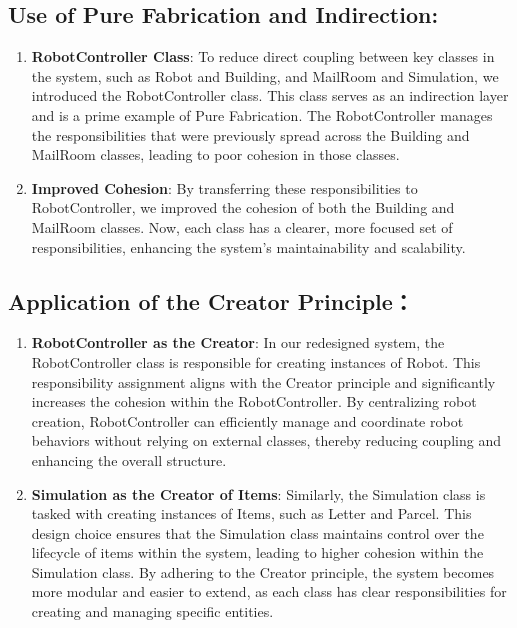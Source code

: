 \documentclass[12pt]{article}
\begin{document}
\subsection{Use of Pure Fabrication and Indirection:}
\begin{enumerate}
    \item \textbf{RobotController Class}: To reduce direct coupling between key classes in the system, such as Robot and Building, and MailRoom and Simulation, we introduced the RobotController class. This class serves as an indirection layer and is a prime example of Pure Fabrication. The RobotController manages the responsibilities that were previously spread across the Building and MailRoom classes, leading to poor cohesion in those classes.
    \item \textbf{Improved Cohesion}: By transferring these responsibilities to RobotController, we improved the cohesion of both the Building and MailRoom classes. Now, each class has a clearer, more focused set of responsibilities, enhancing the system's maintainability and scalability.
\end{enumerate}

\subsection{Application of the Creator Principle：}
\begin{enumerate}
    \item \textbf{RobotController as the Creator}: In our redesigned system, the RobotController class is responsible for creating instances of Robot. This responsibility assignment aligns with the Creator principle and significantly increases the cohesion within the RobotController. By centralizing robot creation, RobotController can efficiently manage and coordinate robot behaviors without relying on external classes, thereby reducing coupling and enhancing the overall structure.
    \item \textbf{Simulation as the Creator of Items}: Similarly, the Simulation class is tasked with creating instances of Items, such as Letter and Parcel. This design choice ensures that the Simulation class maintains control over the lifecycle of items within the system, leading to higher cohesion within the Simulation class. By adhering to the Creator principle, the system becomes more modular and easier to extend, as each class has clear responsibilities for creating and managing specific entities.
\end{enumerate}
\end{document}
